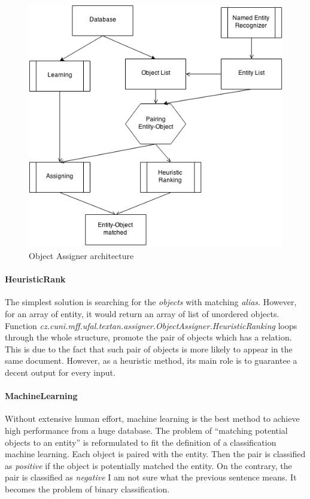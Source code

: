\begin{figure}[!htb]
        \centering
        \includegraphics[width=\textwidth]{Images/assigner.png}
        \caption{Object Assigner architecture}
        \label{fig:objectassigner}
\end{figure}


\paragraph{HeuristicRank}
The simplest solution is searching for the \textit{objects} with matching 
\textit{alias}. However, for an array of entity, it would return an array of 
list of unordered objects. Function
\emph{cz.\-cuni.\-mff.\-ufal.\-textan.\-assigner.\-ObjectAssigner.\-HeuristicRanking}
loops through the whole structure, promote the pair of objects which has a
relation. This is due to the fact that such pair of objects is more likely to
appear in the same document. However, as a heuristic method, its main role is to
guarantee a decent output for every input.


\paragraph{MachineLearning}
Without extensive human effort, machine learning is the best method to achieve
high performance from a huge database. The problem of ``matching potential
objects to an entity'' is reformulated to fit the definition of a classification
machine learning. Each object is paired with the entity. Then the pair is
classified as \emph{positive} if the object is potentially matched the entity.
On the contrary, the pair is classified as \emph{negative} 
{I am not sure what the previous sentence means}. It becomes the
problem of binary classification.


